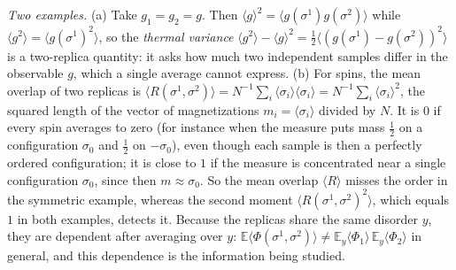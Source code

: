 \begin{remark}
\emph{Two examples.} (a) Take $g_1=g_2=g$. Then $\langle g\rangle^2=\langle g(\sigma^1)g(\sigma^2)\rangle$ while $\langle g^2\rangle=\langle g(\sigma^1)^2\rangle$, so the \emph{thermal variance}
$\langle g^2\rangle-\langle g\rangle^2=\tfrac12\langle(g(\sigma^1)-g(\sigma^2))^2\rangle$ is a two-replica quantity: it asks how much two independent samples differ in the observable $g$, which a single average cannot express.
(b) For spins, the mean overlap of two replicas is $\langle R(\sigma^1,\sigma^2)\rangle=N^{-1}\sum_i\langle\sigma_i\rangle\langle\sigma_i\rangle=N^{-1}\sum_i\langle\sigma_i\rangle^2$, the squared length of the vector of magnetizations $m_i=\langle\sigma_i\rangle$ divided by $N$.
It is $0$ if every spin averages to zero (for instance when the measure puts mass $\tfrac12$ on a configuration $\sigma_0$ and $\tfrac12$ on $-\sigma_0$), even though each sample is then a perfectly ordered configuration;
it is close to $1$ if the measure is concentrated near a single configuration $\sigma_0$, since then $m\approx\sigma_0$. So the mean overlap $\langle R\rangle$ misses the order in the symmetric example, whereas the second moment $\langle R(\sigma^1,\sigma^2)^2\rangle$, which equals $1$ in both examples, detects it.
Because the replicas share the same disorder $y$, they are dependent after averaging over $y$: $\mathbb E\langle\Phi(\sigma^1,\sigma^2)\rangle\ne
\mathbb E_y\langle\Phi_1\rangle\,\mathbb E_y\langle\Phi_2\rangle$ in general, and this dependence is the information being studied.


\end{remark}
